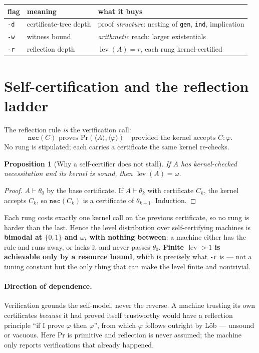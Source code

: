 \documentclass[11pt,a4paper]{article}
\newtheorem{proposition}{Proposition}
\newcommand{\lev}{\operatorname{lev}}
\renewcommand{\Pr}{\mathrm{Pr}}
\begin{document}
\begin{center}
\begin{tabular}{@{}llp{7.3cm}@{}}
\toprule
flag & meaning & what it buys \\
\midrule
\texttt{-d} & certificate-tree depth & proof \emph{structure}: nesting of
\texttt{gen}, \texttt{ind}, implication \\
\texttt{-w} & witness bound & \emph{arithmetic} reach: larger existentials \\
\texttt{-r} & reflection depth & $\lev(A) = r$, each rung kernel-certified \\
\bottomrule
\end{tabular}
\end{center}

\section{Self-certification and the reflection ladder}

The reflection rule \emph{is} the verification call:
\[
\texttt{nec}(C) \text{ proves } \Pr(\langle A\rangle, \langle \varphi\rangle)
\quad\text{provided the kernel accepts } C : \varphi.
\]
No rung is stipulated; each carries a certificate the same kernel re-checks.

\begin{proposition}[Why a self-certifier does not stall]\label{prop:omega}
If $A$ has kernel-checked necessitation and its kernel is sound, then
$\lev(A) = \omega$.
\end{proposition}
\begin{proof}
$A \vdash \theta_0$ by the base certificate. If $A \vdash \theta_k$ with
certificate $C_k$, the kernel accepts $C_k$, so $\texttt{nec}(C_k)$ is a
certificate of $\theta_{k+1}$. Induction.
\end{proof}

Each rung costs exactly one kernel call on the previous certificate, so no rung
is harder than the last. Hence the level distribution over self-certifying
machines is \textbf{bimodal at $\{0,1\}$ and $\omega$, with nothing between}: a
machine either has the rule and runs away, or lacks it and never passes
$\theta_0$. \textbf{Finite $\lev > 1$ is achievable only by a resource bound},
which is precisely what \texttt{-r} is --- not a tuning constant but the only
thing that can make the level finite and nontrivial.

\paragraph{Direction of dependence.} Verification grounds the self-model, never
the reverse. A machine trusting its own certificates \emph{because} it had
proved itself trustworthy would have a reflection principle ``if I prove
$\varphi$ then $\varphi$'', from which $\varphi$ follows outright by L\"ob ---
unsound or vacuous. Here $\Pr$ is primitive and reflection is never assumed;
the machine only reports verifications that already happened.
\end{document}

